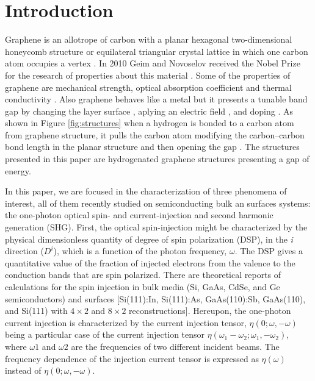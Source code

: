 \documentclass[aps,pra,11pt,tightenlines,showpacs,superscriptaddress,groupedaddress]{revtex4-1}
\begin{document}

\section{Introduction}\label{sec:intro}


Graphene is an allotrope of carbon with a planar hexagonal two-dimensional
honeycomb structure or equilateral triangular crystal lattice in which one
carbon atom occupies a vertex \cite{geim2007rise}. In 2010 Geim and Novoselov
received the Nobel Prize for the research of properties about this material
\cite{geim2007rise}. Some of the properties of graphene are mechanical
strength, optical absorption coefficient and thermal conductivity
\cite{geim2007rise, nair2008fine}. Also graphene behaves like a metal
\cite{geim2007rise} but it presents a tunable band gap by changing the layer
surface \cite{han2007energy}, aplying an electric field \cite{zhang2009direct},
and doping \cite{ohta2006controlling,
elias2009control,guisinger2009exposure,samarakoon2010tunable}. As shown in
Figure \ref{fig:structures} when a hydrogen is bonded to a carbon atom from
graphene structure, it pulls the carbon atom modifying the carbon--carbon bond
length in the planar structure and then opening the gap
\cite{samarakoon2010tunable}. The structures presented in this paper are
hydrogenated graphene structures presenting a gap of energy.


In this paper, we are focused in the characterization of three phenomena of
interest, all of them recently studied on semiconducting bulk an surfaces
systems: the one-photon optical spin- and current-injection and  second
harmonic generation (SHG). First, the optical spin-injection might be
characterized by the physical dimensionless quantity of degree of spin
polarization (DSP), in the \emph{i} direction ($D^{i}$), which is a function of
the photon frequency, $\omega$. The DSP gives a quantitative value of the
fraction of injected electrons from the valence to the conduction bands that
are spin polarized. There are theoretical reports of calculations for the spin
injection in bulk media  (Si, GaAs, CdSe, and Ge semiconductors)
\cite{nastos2007full,cabellos2009stress,rioux2010optical} and surfaces
[Si(111):In, Si(111):As, GaAs(110):Sb, GaAs(110), and Si(111) with $4\times2$
and $8\times2$ reconstructions]\cite{mendoza2012optical,arzate2014optical}.
Hereupon, the one-photon current injection is characterized by the current
injection tensor, $\eta(0;\omega,-\omega)$  being a particular case of the
current injection tensor $\eta(\omega_{1}-\omega_{2};\omega_{1},-\omega_{2})$,
where $\omega{1}$ and $\omega{2}$ are the frequencies of two different incident
beams. The frequency dependence of the injection current tensor is expressed as
$\eta(\omega)$ instead of $\eta(0;\omega,-\omega)$.
\end{document}
